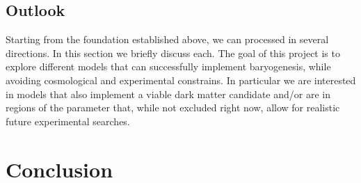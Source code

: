 \documentclass[13pt,a4paper,twoside,titlepage]{article}
\begin{document}
\subsection{Outlook}
\label{sec:outlook}

Starting from the foundation established above, we can processed in several directions.
In this section we briefly discuss each. The goal of this project is to explore
different models that can successfully implement baryogenesis, while avoiding cosmological and
experimental constrains.
In particular we are interested in models that also implement a viable dark matter candidate
and/or are in regions of the parameter that, while not excluded right now, allow for realistic future experimental searches.













\section{Conclusion}
\label{sec:conclusion}


\newpage
\printbibliography
\end{document}
